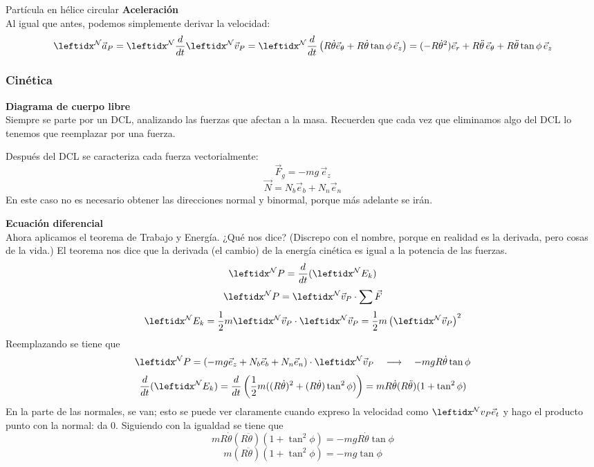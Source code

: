\begin{solucion}{Partícula en hélice circular}
\textbf{Aceleración}\\
Al igual que antes, podemos simplemente derivar la velocidad:
$$\marc{\vec{a}_P}{N}=\der{\marc{\vec{v}_P}{N}{}}{N}{}=\der{\left(R\dot\theta\vec{e}_\theta+R\dot\theta\tan\phi\,\vec{e}_z\right)}{N}{}=(-R\dot\theta^2)\vec{e}_r+ R\ddot\theta\,\vec{e}_{\theta}+R\ddot\theta\tan\phi\,\vec{e}_z$$

\subsubsection*{Cinética}
\textbf{Diagrama de cuerpo libre}\\
Siempre se parte por un DCL, analizando las fuerzas que afectan a la masa. Recuerden que cada vez que eliminamos algo del DCL lo tenemos que reemplazar por una fuerza.
\begin{center}
\end{center}
Después del DCL se caracteriza cada fuerza vectorialmente:
$$\vec{F}_g=-mg\,\vec{e}_z$$
$$\vec{N}=N_b\vec{e}_b+N_n\vec{e}_n$$
En este caso no es necesario obtener las direcciones normal y binormal, porque más adelante se irán.

\textbf{Ecuación diferencial}\\
Ahora aplicamos el teorema de Trabajo y Energía. ¿Qué nos dice? (Discrepo con el nombre, porque en realidad es la derivada, pero cosas de la vida.) El teorema nos dice que la derivada (el cambio) de la energía cinética es igual a la potencia de las fuerzas.
$$\marc{P}{N}=\dfrac{d}{dt}(\marc{E_k}{N}{})$$
$$\marc{P}{N}=\marc{\vec{v}_P}{N}\cdot\sum \vec{F}$$
$$\marc{E_k}{N}=\dfrac{1}{2}m \marc{\vec{v}_P}{N}\cdot\marc{\vec{v}_P}{N}=\dfrac{1}{2}m \left(\marc{\vec{v}_P}{N}\right)^2$$
Reemplazando se tiene que
$$\marc{P}{N}=(-mg\vec{e}_z+N_b\vec{e}_b+N_n\vec{e}_n)\cdot\marc{\vec{v}_P}{N}\quad\longrightarrow\quad-mgR\dot\theta\tan\phi$$
$$\dfrac{d}{dt}(\marc{E_k}{N}{})=\dfrac{d}{dt}\left(\dfrac{1}{2}m((R\dot\theta)^2+(R\dot\theta)\tan^2\phi)\right)=mR\dot\theta (R\ddot\theta)(1+\tan^2\phi)$$
En la parte de las normales, se van; esto se puede ver claramente cuando expreso la velocidad como $\marc{v_P}{N}\vec{e}_t$ y hago el producto punto con la normal: da 0. Siguiendo con la igualdad se tiene que
$$mR\dot\theta (R\ddot\theta)(1+\tan^2\phi)=-mgR\dot\theta\tan\phi$$
$$m(R\ddot\theta)(1+\tan^2\phi)=-mg\tan\phi$$


\end{solucion}
